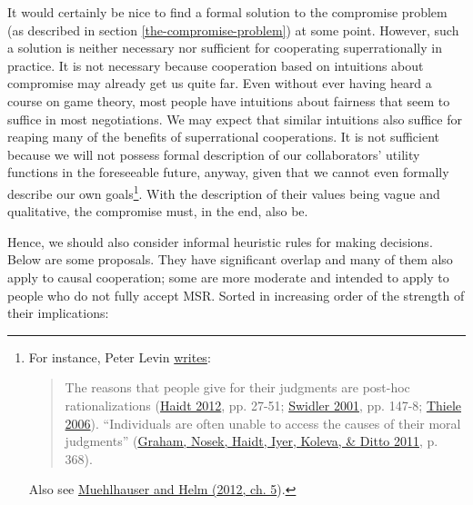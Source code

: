 It would certainly be nice to find a formal solution to the compromise
problem (as described in section
\ref{the-compromise-problem}) at some point. However, such a solution is neither
necessary nor sufficient for cooperating superrationally in practice. It
is not necessary because cooperation based on intuitions about
compromise may already get us quite far. Even without ever having heard
a course on game theory, most people have intuitions about fairness that
seem to suffice in most negotiations. We may expect that similar
intuitions also suffice for reaping many of the benefits of
superrational cooperations. It is not sufficient because we will not
possess formal description of our collaborators' utility functions in
the foreseeable future, anyway, given that we cannot even formally
describe our own goals\footnote{\label{we-do-not-know-our-utility-function}
  For instance, Peter Levin
  \href{http://peterlevine.ws/?p=16998}{writes}:

  \begin{quote}
  The reasons that people give for their judgments are post-hoc
  rationalizations
  (\href{https://en.wikipedia.org/wiki/The_Righteous_Mind}{Haidt
  2012}, pp. 27-51;
  \href{https://en.wikipedia.org/wiki/Ann_Swidler\#Major_works}{Swidler
  2001}, pp. 147-8;
  \href{http://assets.cambridge.org/97805218/64442/frontmatter/9780521864442_frontmatter.pdf}{Thiele
  2006}). ``Individuals are often unable to access the causes of their
  moral judgments''
  (\href{http://citeseerx.ist.psu.edu/viewdoc/download?doi=10.1.1.704.8390\&rep=rep1\&type=pdf}{Graham,
  Nosek, Haidt, Iyer, Koleva, \& Ditto 2011}, p. 368).
  \end{quote}

  Also see
  \href{https://intelligence.org/files/IE-ME.pdf}{Muehlhauser and
  Helm (2012, ch. 5}).}. With the description of their values being
vague and qualitative, the compromise must, in the end, also be.

Hence, we should also consider informal heuristic rules for making
decisions. Below are some proposals. They have significant overlap and
many of them also apply to causal cooperation; some are more moderate
and intended to apply to people who do not fully accept MSR. Sorted in
increasing order of the strength of their implications:


